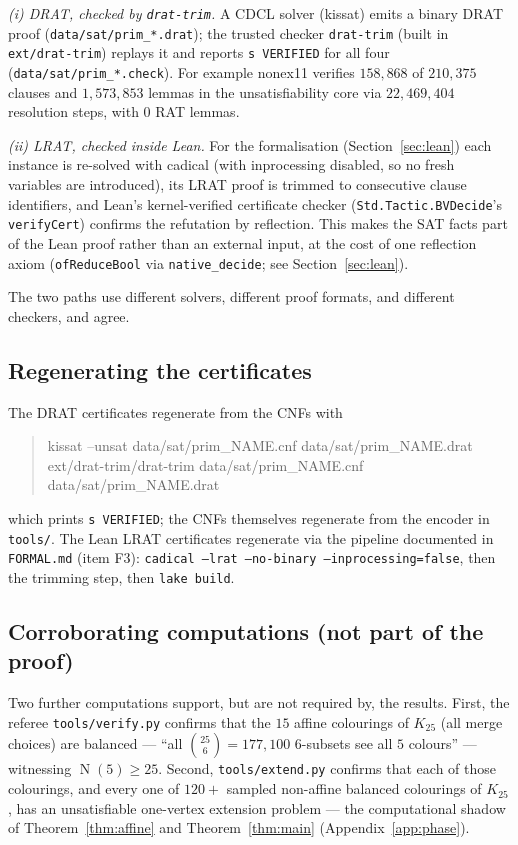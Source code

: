 \documentclass[11pt,reqno]{amsart}
\theoremstyle{definition}
\theoremstyle{remark}
\DeclareMathOperator{\Ncap}{N}
\begin{document}
\emph{(i) DRAT, checked by \texttt{drat-trim}.} A CDCL solver (kissat) emits a binary
DRAT proof (\texttt{data/sat/prim\_*.drat}); the trusted checker \texttt{drat-trim}
(built in \texttt{ext/drat-trim}) replays it and reports \verb|s VERIFIED| for all
four (\texttt{data/sat/prim\_*.check}). For example \textsf{nonex11} verifies
$158{,}868$ of $210{,}375$ clauses and $1{,}573{,}853$ lemmas in the unsatisfiability
core via $22{,}469{,}404$ resolution steps, with $0$ RAT lemmas.

\emph{(ii) LRAT, checked inside Lean.} For the formalisation (Section~\ref{sec:lean})
each instance is re-solved with cadical (with inprocessing disabled, so no fresh
variables are introduced), its LRAT proof is trimmed to consecutive clause
identifiers, and Lean's kernel-verified certificate checker
(\texttt{Std.Tactic.BVDecide}'s \texttt{verifyCert}) confirms the refutation by
reflection. This makes the SAT facts part of the Lean proof rather than an external
input, at the cost of one reflection axiom (\texttt{ofReduceBool} via
\texttt{native\_decide}; see Section~\ref{sec:lean}).

The two paths use different solvers, different proof formats, and different checkers,
and agree.

\subsection{Regenerating the certificates}
The DRAT certificates regenerate from the CNFs with
\begin{quote}\ttfamily
kissat --unsat data/sat/prim\_NAME.cnf data/sat/prim\_NAME.drat\\
ext/drat-trim/drat-trim data/sat/prim\_NAME.cnf data/sat/prim\_NAME.drat
\end{quote}
which prints \verb|s VERIFIED|; the CNFs themselves regenerate from the encoder in
\texttt{tools/}. The Lean LRAT certificates regenerate via the pipeline documented
in \texttt{FORMAL.md} (item F3): \texttt{cadical --lrat --no-binary
--inprocessing=false}, then the trimming step, then \texttt{lake build}.

\subsection{Corroborating computations (not part of the proof)}
Two further computations support, but are not required by, the results. First, the
referee \texttt{tools/verify.py} confirms that the $15$ affine colourings of
$K_{25}$ (all merge choices) are balanced --- ``all $\binom{25}{6}=177{,}100$
$6$-subsets see all $5$ colours'' --- witnessing $\Ncap(5)\ge 25$. Second,
\texttt{tools/extend.py} confirms that each of those colourings, and every one of
$120+$ sampled non-affine balanced colourings of $K_{25}$, has an unsatisfiable
one-vertex extension problem --- the computational shadow of Theorem~\ref{thm:affine}
and Theorem~\ref{thm:main} (Appendix~\ref{app:phase}).
\end{document}
